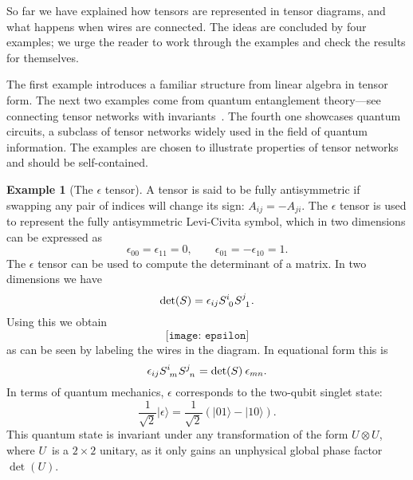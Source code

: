 \documentclass[aps,pra,12pt,nofootinbib,superscriptaddress,longbibliography]{revtex4-1}
\theoremstyle{plain}
\theoremstyle{definition}
\newtheorem{example}[theorem]{Example}
\newcommand{\ket}[1]{\mbox{$|#1\rangle$}}
\newcommand{\C}{{\mathbb C}}  %
\newcommand{\be}{\begin{equation}}
\newcommand{\ee}{\end{equation}}
\begin{document}
So far we have explained how tensors are represented in tensor diagrams,
and what happens when wires are connected.
The ideas are concluded by four
examples; we urge the reader to work through the examples and check the results for themselves.

The first example introduces a familiar structure from linear algebra in tensor form.
The next two examples come from quantum entanglement theory---see connecting
tensor networks with invariants~\cite{2013JPhA...46U5301B, 2014SIGMA..10..095C}.
The fourth one showcases quantum circuits, a subclass of tensor networks
widely used in the field of quantum information.
The examples are chosen to illustrate properties of tensor networks and should be self-contained. 


\begin{example}[The $\epsilon$ tensor]\label{ex:epsilon}
A tensor is said to be fully antisymmetric if swapping any pair of
indices will change its sign: $A_{ij} = -A_{ji}$.
The $\epsilon$ tensor is used to represent the fully antisymmetric Levi-Civita
symbol, which in two dimensions can be expressed as
\begin{equation}
 \epsilon_{00}=\epsilon_{11}=0, \qquad
 \epsilon_{01}=-\epsilon_{10}=1.
\end{equation}
The $\epsilon$ tensor can be used to compute the determinant of a matrix. In two dimensions we have
\be
\det(S) = \epsilon_{ij} S\indices{^i_0} S\indices{^j_1}.
\ee
Using this we obtain
\be
 \texttt{[image: epsilon]}
\ee
as can be seen by labeling the wires in the diagram.
In equational form this is
\begin{equation}
\epsilon_{ij} S\indices{^i_m} S\indices{^j_n} = \det(S) \: \epsilon_{mn}.
\end{equation}
In terms of quantum mechanics, $\epsilon$ corresponds to the two-qubit
singlet state:
\be\label{eqn:singlet}
\frac{1}{\sqrt{2}} \ket{\epsilon} = \frac{1}{\sqrt{2}}(\ket{01}-\ket{10}).
\ee
This quantum state is invariant under any transformation of the form $U \otimes U$, where $U$~is a $2\times 2$ unitary,
as it only gains an unphysical global phase factor~$\det(U)$.

\end{example}
\end{document}

